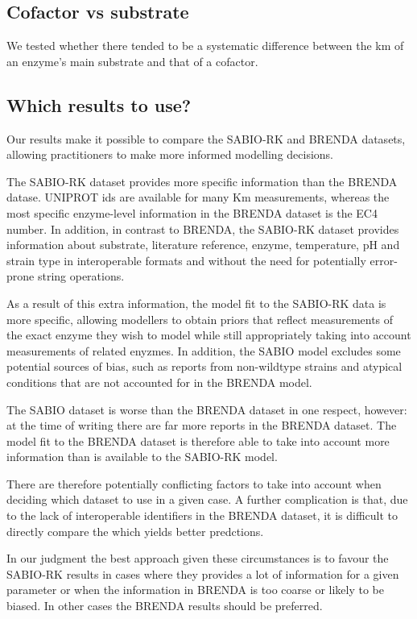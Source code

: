 \documentclass[11pt]{article}
\begin{document}
\subsection{Cofactor vs substrate}
\label{sec:org96fe3d4}
We tested whether there tended to be a systematic difference between the km of
an enzyme's main substrate and that of a cofactor. 

\subsection{Which results to use?}
\label{sec:orgb01d466}

Our results make it possible to compare the SABIO-RK and BRENDA datasets,
allowing practitioners to make more informed modelling decisions.

The SABIO-RK dataset provides more specific information than the BRENDA
datase. UNIPROT ids are available for many Km measurements, whereas the most
specific enzyme-level information in the BRENDA dataset is the EC4 number. In
addition, in contrast to BRENDA, the SABIO-RK dataset provides information about
substrate, literature reference, enzyme, temperature, pH and strain type in
interoperable formats and without the need for potentially error-prone string
operations.

As a result of this extra information, the model fit to the SABIO-RK data is
more specific, allowing modellers to obtain priors that reflect measurements of
the exact enzyme they wish to model while still appropriately taking into
account measurements of related enyzmes. In addition, the SABIO model excludes
some potential sources of bias, such as reports from non-wildtype strains and
atypical conditions that are not accounted for in the BRENDA model.

The SABIO dataset is worse than the BRENDA dataset in one respect, however: at
the time of writing there are far more reports in the BRENDA dataset. The model
fit to the BRENDA dataset is therefore able to take into account more
information than is available to the SABIO-RK model.

There are therefore potentially conflicting factors to take into account when
deciding which dataset to use in a given case. A further complication is that,
due to the lack of interoperable identifiers in the BRENDA dataset, it is
difficult to directly compare the which yields better predctions.

In our judgment the best approach given these circumstances is to favour the
SABIO-RK results in cases where they provides a lot of information for a given
parameter or when the information in BRENDA is too coarse or likely to be
biased. In other cases the BRENDA results should be preferred.
\end{document}
